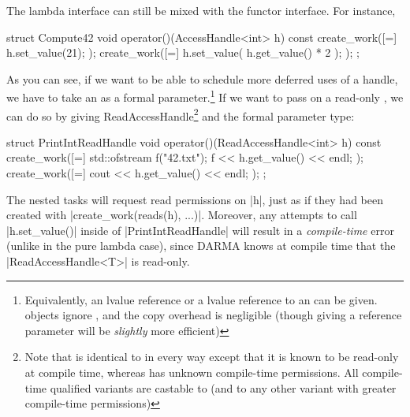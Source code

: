 The \gls{lambda} interface can still be mixed with the functor interface.  For
instance,
\begin{CppCodeNumb}
struct Compute42 {
  void operator()(AccessHandle<int> h) const {
    create_work([=]{
      h.set_value(21);
    });
    create_work([=]{
      h.set_value( h.get_value() * 2 );
    });
  }
};
\end{CppCodeNumb}
As you can see, if we want to be able to schedule more deferred uses of a
\gls{handle}, we have to take an  as a formal
parameter.\footnote{Equivalently, an lvalue reference or a 
lvalue reference to an  can be given. 
 objects ignore , and the copy
overhead is negligible (though giving a reference parameter will be {\it
slightly} more efficient)}  If we want to pass on a read-only , we
can do so by giving ReadAccessHandle\footnote{Note that
is identical to 
in every way except that it is known to be read-only at compile time, whereas
 has unknown compile-time permissions.  All
compile-time qualified  variants are castable to
 (and to any other 
variant with greater compile-time permissions)} and the formal parameter type:
\begin{CppCodeNumb}
struct PrintIntReadHandle {
  void operator()(ReadAccessHandle<int> h) const {
    create_work([=]{
      std::ofstream f("42.txt");
      f << h.get_value() << endl;
    });
    create_work([=]{
      cout << h.get_value() << endl;
    });
  }
};
\end{CppCodeNumb}
The nested \glspl{task} will request read permissions on |h|, just as if they had been
created with |create_work(reads(h), ...)|.  Moreover, any attempts to call
|h.set_value()| inside of |PrintIntReadHandle| will result in a {\it
compile-time} error (unlike in the pure \gls{lambda} case), since \gls{DARMA} knows at
compile time that the |ReadAccessHandle<T>| is read-only.  

